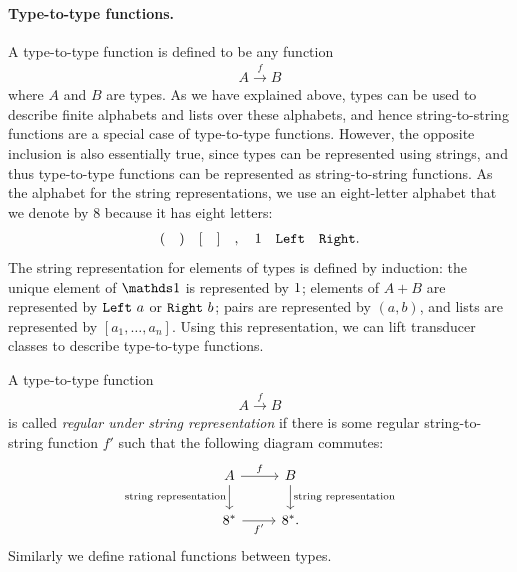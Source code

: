 \paragraph*{Type-to-type functions.}
A type-to-type function is defined to be  any function 
\begin{align*}
A \xrightarrow f B
\end{align*}
where $A$ and $B$ are types. As we have explained above, types can be used to describe finite alphabets and lists over these alphabets, and hence string-to-string functions are a special case of type-to-type functions.  However, the opposite inclusion is also essentially true, since types can be represented using strings, and thus type-to-type functions can be represented as string-to-string functions.
As the alphabet for the string representations,  we use  an eight-letter alphabet that we denote by $8$ because it has eight letters: 
\begin{align*}
( \quad ) \quad [ \quad ] \quad , \quad 1 \quad \mathtt{Left} \quad \mathtt{Right}.
\end{align*}
 The string representation for elements of types is defined by induction:  the unique element of $\onetype$ is represented by  $1$; elements of $A + B$ are represented by $\mathtt{Left}\  a$ or $\mathtt{Right}\  b$; pairs are represented by $(a,b)$, and lists are represented by $[a_1,\ldots,a_n]$. Using this representation, we can  lift transducer classes to describe type-to-type functions.







\begin{definition}\label{def:regular-functions-on-types-under-string-representation}
    A type-to-type function
    \begin{align*}
    A \xrightarrow f  B
    \end{align*}
    is called \emph{regular under string representation} if there is some regular string-to-string function $f'$ such that the following diagram commutes:
    \[
    \begin{tikzcd}
    A 
    \ar[r,"f"]
    \ar[d,"\text{string representation}"']
    &
    \ar[d,"\text{string representation}"]
    B
    \\
    8^* 
    \ar[r,"f'"']
    &
    8^*.
    \end{tikzcd}
    \]
     Similarly we define rational functions between types.
\end{definition}

